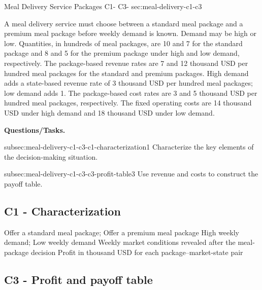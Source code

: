 	\sectionScored
	{Meal Delivery Service Packages}
	{C1- \hspace{2mm} C3-}
	{sec:meal-delivery-c1-c3}
	{
		A meal delivery service must choose between a standard meal package and a
		premium meal package before weekly demand is known. Demand may be
		high or low. Quantities, in hundreds of meal packages, are 10 and 7
		for the standard package and 8 and 5 for the premium package under high and
		low demand, respectively. The package-based revenue rates are 7 and 12
		thousand USD per hundred meal packages for the standard and premium
		packages. High demand adds a state-based revenue rate of 3 thousand USD
		per hundred meal packages; low demand adds 1. The package-based cost rates
		are 3 and 5 thousand USD per hundred meal packages, respectively. The
		fixed operating costs are 14 thousand USD under high demand and
		18 thousand USD under low demand.
		
			\textbf{Questions/Tasks.}
		\begin{enumerate}
			\CriterionTask
			{subsec:meal-delivery-c1-c3-c1-characterization}{1}
			{Characterize the key elements of the decision-making situation. }
			
			\CriterionTask
			{subsec:meal-delivery-c1-c3-c3-profit-table}{3}
			{Use revenue and costs to construct the payoff table. }
		\end{enumerate}
		
		\label{subsec:meal-delivery-c1-c3-c1-characterization}
		\subsection*{C1 - Characterization }
		
		\DecisionElementsTable
		{Offer a standard meal package; Offer a premium meal package}
		{High weekly demand; Low weekly demand}
		{Weekly market conditions revealed after the meal-package decision}
		{Profit in thousand USD for each package--market-state pair}
		
		\label{subsec:meal-delivery-c1-c3-c3-profit-table}
		\subsection*{C3 - Profit and payoff table }
		
		
}
